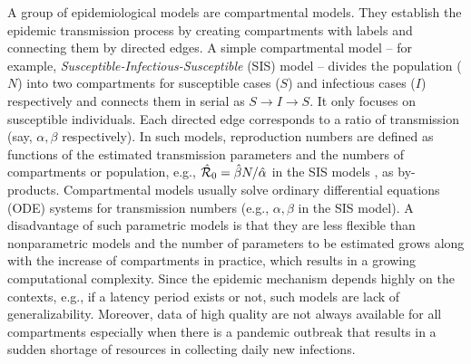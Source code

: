 A group of epidemiological models are compartmental models. They establish the epidemic transmission process by creating compartments with labels and connecting them by directed edges. A simple compartmental model -- for example, \textit{Susceptible-Infectious-Susceptible} (SIS) model -- divides the population ($N$) into two compartments for susceptible cases ($S$) and infectious cases ($I$) respectively and connects them in serial as $S\to I\to S$. It only focuses on susceptible individuals. Each directed edge corresponds to a ratio of transmission (say, $\alpha,\beta$ respectively). In such models, reproduction numbers are defined as functions of the estimated transmission parameters and the numbers of compartments or population, e.g., $\hat{\mathcal{R}}_0=\hat{\beta} N/\hat{\alpha}$ in the SIS models \cite{brauer2019mathematical}, as by-products. Compartmental models usually solve ordinary differential equations (ODE) systems for transmission numbers (e.g., $\alpha,\beta$ in the SIS model). A disadvantage of such parametric models is that they are less flexible than nonparametric models and the number of parameters to be estimated grows along with the increase of compartments in practice, which results in a growing computational complexity. Since the epidemic mechanism depends highly on the contexts, e.g., if a latency period exists or not, such models are lack of generalizability. Moreover, data of high quality are not always available for all compartments especially when there is a pandemic outbreak that results in a sudden shortage of resources in collecting daily new infections. %

